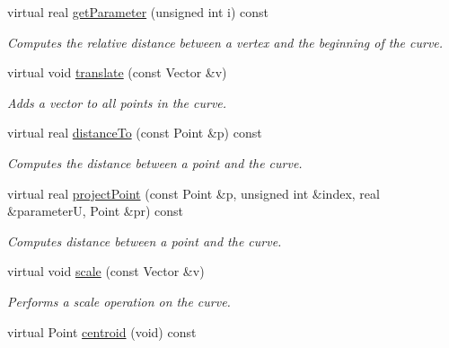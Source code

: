 \begin{DoxyCompactItemize}
virtual real \hyperlink{classPolygonalCurve_a1d0423f2d68ef796264c316bdf0fc6b8}{getParameter} (unsigned int i) const 
\begin{DoxyCompactList}\small\item\em Computes the relative distance between a vertex and the beginning of the curve. \end{DoxyCompactList}\item 
virtual void \hyperlink{classPolygonalCurve_a888b53eb0dd9492861ae6d273bde259e}{translate} (const Vector \&v)
\begin{DoxyCompactList}\small\item\em Adds a vector to all points in the curve. \end{DoxyCompactList}\item 
virtual real \hyperlink{classPolygonalCurve_af4ad508963e23e4bf1418f9fdf28b17d}{distanceTo} (const Point \&p) const 
\begin{DoxyCompactList}\small\item\em Computes the distance between a point and the curve. \end{DoxyCompactList}\item 
virtual real \hyperlink{classPolygonalCurve_a51501ba05c93f4231053c1c84013fe22}{projectPoint} (const Point \&p, unsigned int \&index, real \&parameterU, Point \&pr) const 
\begin{DoxyCompactList}\small\item\em Computes distance between a point and the curve. \end{DoxyCompactList}\item 
virtual void \hyperlink{classPolygonalCurve_a8a3935026ba1e10883d79394f691b0ca}{scale} (const Vector \&v)
\begin{DoxyCompactList}\small\item\em Performs a scale operation on the curve. \end{DoxyCompactList}\item 
\hypertarget{classPolygonalCurve_a03bf9cc4067ee6f111f8bc1d6cc2753b}{
virtual Point \hyperlink{classPolygonalCurve_a03bf9cc4067ee6f111f8bc1d6cc2753b}{centroid} (void) const }
\label{classPolygonalCurve_a03bf9cc4067ee6f111f8bc1d6cc2753b}


\end{DoxyCompactItemize}
